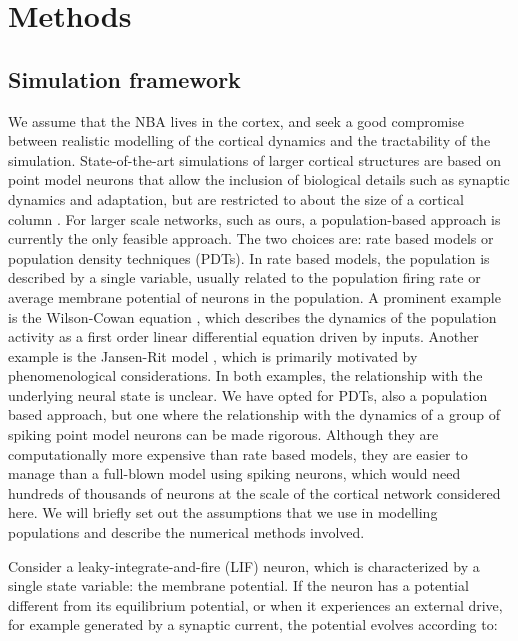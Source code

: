 \documentclass[10pt]{article}
\begin{document}
{\section{Methods}

{\label{488128}}

\subsection{Simulation framework}\label{simulation-framework}

We assume that the NBA lives in the cortex, and seek a good compromise between realistic modelling of the cortical dynamics and the tractability of the simulation.
State-of-the-art simulations of larger cortical structures are based on point model neurons that allow the inclusion of biological details such as synaptic dynamics and adaptation, but are restricted to about the size of a cortical column \cite{potjans2014}.
For larger scale networks, such as ours, a population-based approach is currently the only feasible approach.
The two choices are: rate based models or population density techniques (PDTs).
In rate based models, the population is described by a single variable, usually related to the population firing rate or average membrane potential of neurons in the population. 
A prominent example is the  Wilson-Cowan equation \cite{wilson1972}, which describes the dynamics of the population activity as a first order linear differential equation driven by inputs.
Another example is the Jansen-Rit model \cite{jansen1995}, which is primarily motivated by phenomenological considerations.
In both examples, the relationship with the underlying neural state is unclear. We have opted for PDTs, also a population based approach,  but one where the relationship with the dynamics of  a group of spiking point model neurons can be made rigorous.
Although they are computationally more expensive than rate based models, they are easier to manage than a full-blown model using spiking neurons, which would need hundreds of thousands of neurons at the scale of the cortical network considered here.
We will briefly set out the assumptions that we use in modelling populations and describe the numerical methods involved.

Consider a leaky-integrate-and-fire (LIF) neuron, which is characterized by a single state variable: the membrane potential.
If the neuron has a potential different from its equilibrium potential, or when it experiences an external drive, for example generated by a synaptic current, the potential evolves according to:

}
\end{document}
